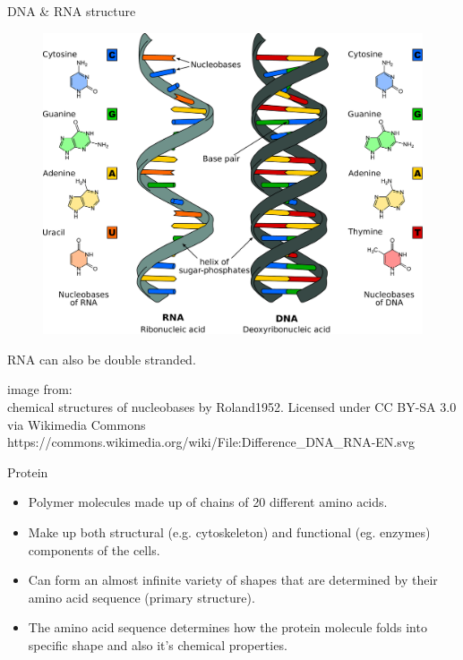 \documentclass[pdf]{beamer}
\newcommand\subHeading[1]{
  \par\bigskip {\Large\bfseries#1}\par\smallskip
}
\begin{document}
\begin{frame}{DNA \& RNA structure}
  \begin{figure}[ht]
    \includegraphics[height=0.7\textheight]{images/Difference_DNA_RNA-EN.pdf}
  \end{figure}
  \small RNA can also be double stranded.

  {\tiny
    image from:\\
    chemical structures of nucleobases by Roland1952. Licensed under CC BY-SA 3.0 via Wikimedia Commons\\
    https://commons.wikimedia.org/wiki/File:Difference\_DNA\_RNA-EN.svg
    \par
  }
\end{frame}

\begin{frame}{Protein}
  \subHeading{What is Protein?}
  \begin{itemize}
    \item Polymer molecules made up of chains of 20 different amino acids.
    \item Make up both structural (e.g. cytoskeleton) and functional (eg. enzymes)
      components of the cells.
    \item Can form an almost infinite variety of shapes that are determined by
      their amino acid sequence (primary structure).
    \item The amino acid sequence determines how the protein molecule folds into
      specific shape and also it's chemical properties.
  \end{itemize}
\end{frame}
\end{document}
